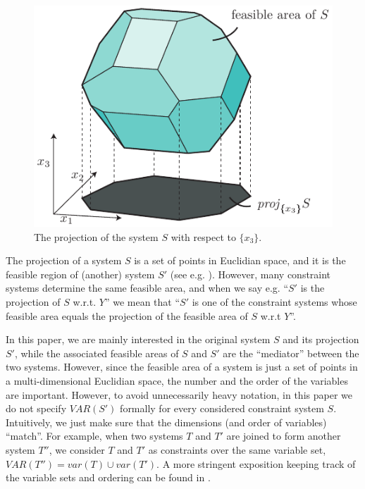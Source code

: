 \begin{figure}
	\centering
		\includegraphics[scale=0.8]{figures/projection2.pdf}
	\caption{The projection of the system $S$ with respect to $\{x_3\}$.}
	\label{fig:proj}
\end{figure}

The projection of a system $S$ is a set of points in Euclidian space, and it is the feasible region of (another) system $S'$ (see e.g. \cite{ziegler95}). However, many constraint systems determine the same feasible area, and when we say e.g. ``$S'$ is the projection of $S$ w.r.t. $Y$'' we mean that ``$S'$ is one of the constraint systems whose feasible area equals the projection of the feasible area of $S$ w.r.t $Y$''.

In this paper, we are mainly interested in the original system $S$ and its projection $S'$, while the associated feasible areas of $S$ and $S'$ are the ``mediator'' between the two systems. 
However, since the feasible area of a system is just a set of points in a multi-dimensional Euclidian space, the number and the order of the variables are important. However, to avoid unnecessarily heavy notation, in this paper we do not specify $VAR(S')$ formally for every considered constraint system $S$.
Intuitively, we just make sure that the dimensions (and order of variables) ``match''. For example, when two systems $T$ and $T'$ are joined to form another system $T''$, we consider $T$ and $T'$ as constraints over the same variable set, $VAR(T'')=var(T)\cup var(T')$.
A more stringent exposition keeping track of the variable sets and ordering can be found in \cite{MyTechRep}.
%
